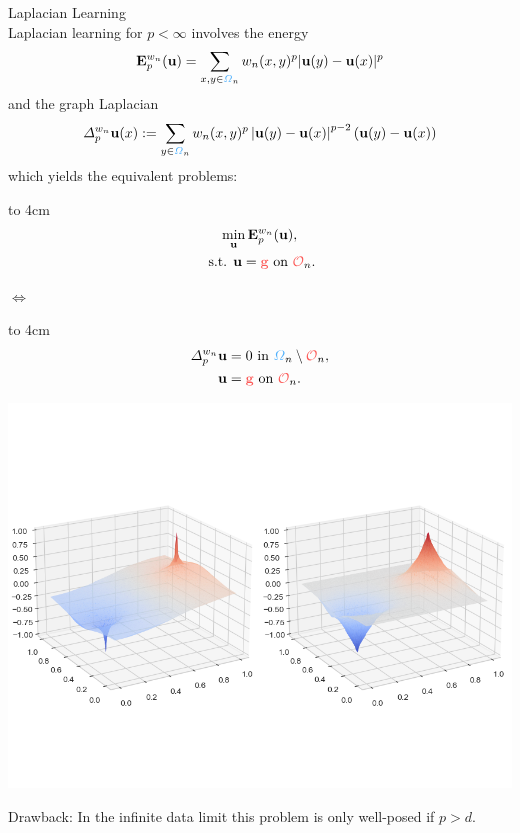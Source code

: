 \begin{minipage}[t][\topHeight][t]{0.33\textwidth}%
{\color{BaseDarkColor} Laplacian Learning}\\%
Laplacian learning for $p<\infty$ involves the energy
\begin{align*}
\vec E_p^{w_n}(\vec u) = \sum_{x,y\in\domain_n}w_n(x,y)^p|\vec u(y)-\vec u(x)|^p
\end{align*}
%
and the graph Laplacian
%
{\small%
\begin{align*}
\Delta^{w_n}_p \vec u(x):= \sum_{y\in\domain_n} w_n(x,y)^p \abs{\vec u(y) - \vec u(x)}^{p-2} \left( \vec u(y) - \vec u(x) \right)
\end{align*}
}%
%
%
which yields the equivalent problems:
\vspace{15pt}

%
\begin{minipage}{.45\textwidth}%
\begin{block}{}%
\vbox to 4cm {%
\belowdisplayskip=0pt%
\abovedisplayskip=0pt%
\begin{gather*}
\min_{\vec u} \vec{E}^{w_n}_p (\vec u),\\
\text{ s.t. } \vec u = \color{grape}\vec g\nc \text{ on } \constr_n.
\end{gather*}\vfill}%
\end{block}
\end{minipage}%
\hfill%
$\Leftrightarrow$
\hfill%
\begin{minipage}{.45\textwidth}%
\begin{block}{}
\vbox to 4cm {%
\belowdisplayskip=0pt%
\abovedisplayskip=0pt%
\begin{align*}
\Delta^{w_n}_p\vec u&= 0\text{ in } \domain_n\setminus\constr_n,\\
\vec u &= \color{grape}\vec g\nc \text{ on } \constr_n.
\end{align*}\vfill}%
\end{block}
%
\end{minipage}%
\vspace{.1em}

%
\begin{minipage}{.5\textwidth}%
\centering%
\includegraphics[width=.7\textwidth, trim={0cm 3cm 11cm 4cm}, clip]{atelier/2Dex_50000.png}%
\end{minipage}%
\begin{minipage}{.5\textwidth}%
\alert{Drawback:} In the infinite data limit this problem is only well-posed if $p>d$.
\end{minipage}%
%
%
\vfill%
%
\end{minipage}%
